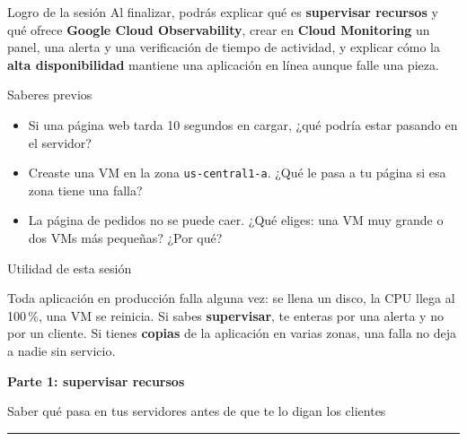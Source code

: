 \documentclass[aspectratio=169,10pt,c]{beamer}
\newcommand{\separador}[2]{%
\begin{frame}[plain]
\vfill
\begin{center}
{\fontsize{29}{34}\selectfont\bfseries #1}\par
\vspace{2mm}
{\small #2}\par
\vspace{4mm}
{\color{utpRojo}\rule{8.5cm}{1.2pt}}
\end{center}
\vfill
\end{frame}}
\begin{document}
\begin{frame}[c]
\begin{block}{Logro de la sesión}
Al finalizar, podrás explicar qué es \textbf{supervisar recursos} y qué ofrece \textbf{Google Cloud Observability}, crear en \textbf{Cloud Monitoring} un panel, una alerta y una verificación de tiempo de actividad, y explicar cómo la \textbf{alta disponibilidad} mantiene una aplicación en línea aunque falle una pieza.
\end{block}
\end{frame}

\begin{frame}{Saberes previos}
\begin{itemize}\setlength\itemsep{11pt}
  \item Si una página web tarda 10 segundos en cargar, ¿qué podría estar pasando en el servidor?
  \item Creaste una VM en la zona \texttt{us-central1-a}. ¿Qué le pasa a tu página si esa zona tiene una falla?
  \item La página de pedidos no se puede caer. ¿Qué eliges: una VM muy grande o dos VMs más pequeñas? ¿Por qué?
\end{itemize}
\end{frame}

\begin{frame}[c]{Utilidad de esta sesión}
\begin{center}
\begin{minipage}{.84\textwidth}
{\large Toda aplicación en producción falla alguna vez: se llena un disco, la CPU llega al 100\,\%, una VM se reinicia. Si sabes \textbf{supervisar}, te enteras por una alerta y no por un cliente. Si tienes \textbf{copias} de la aplicación en varias zonas, una falla no deja a nadie sin servicio.}
\end{minipage}
\end{center}
\end{frame}

\separador{Parte 1: supervisar recursos}{Saber qué pasa en tus servidores antes de que te lo digan los clientes}
\end{document}
